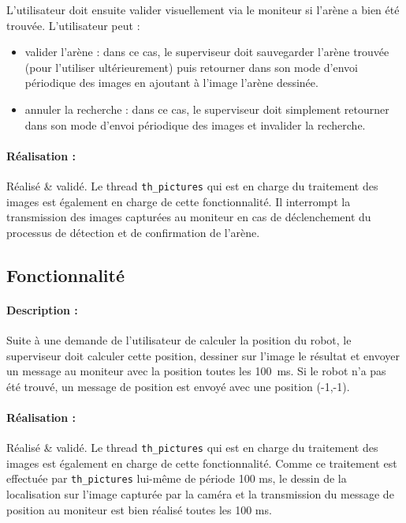 \documentclass[11pt, a4paper]{paper}
\newcounter{cptreq}
\begin{document}
L'utilisateur doit ensuite valider visuellement via le moniteur si l'arène a bien été trouvée. L'utilisateur peut :
\begin{itemize}
	\item valider l'arène : dans ce cas, le superviseur doit sauvegarder l'arène trouvée (pour l'utiliser ultérieurement) puis retourner dans son mode d'envoi périodique des images en ajoutant à l'image l'arène dessinée.
 	\item annuler la recherche : dans ce cas, le superviseur doit simplement retourner dans son mode d'envoi périodique des images et invalider la recherche.
\end{itemize}

\paragraph{\color{black}Réalisation :} {\color{black} Réalisé \& validé. Le thread {\tt th\_pictures} qui est en charge du traitement des images est également en charge de cette fonctionnalité. Il interrompt la transmission des images capturées au moniteur en cas de déclenchement du processus de détection et de confirmation de l'arène.}

\subsection{Fonctionnalité \thecptreq}

\paragraph{Description :} Suite à une demande de l'utilisateur de calculer la position du robot, le superviseur doit calculer cette position, dessiner sur l'image le résultat et envoyer un message au moniteur avec la position toutes les 100~ms. Si le robot n'a pas été trouvé, un message de position est envoyé avec une position (-1,-1).

\paragraph{\color{black}Réalisation :} {\color{black} Réalisé \& validé. Le thread {\tt th\_pictures} qui est en charge du traitement des images est également en charge de cette fonctionnalité. Comme ce traitement est effectuée par {\tt th\_pictures} lui-même de période 100 ms, le dessin de la localisation sur l'image capturée par la caméra et la transmission du message de position au moniteur est bien réalisé toutes les 100 ms.}
\end{document}
